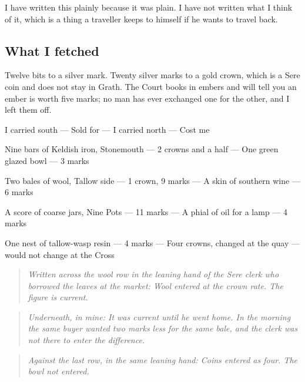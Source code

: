 \documentclass{design/chronicle}
\begin{document}
I have written this plainly because it was plain. I have not written what I think of it, which is a thing a traveller keeps to himself if he wants to travel back.

\subsection*{What I fetched}

Twelve bits to a silver mark. Twenty silver marks to a gold crown, which is a Sere coin and does not stay in Grath. The Court books in embers and will tell you an ember is worth five marks; no man has ever exchanged one for the other, and I left them off.

I carried south — Sold for — I carried north — Cost me\par

Nine bars of Keldish iron, Stonemouth — 2 crowns and a half — One green glazed bowl — 3 marks\par

Two bales of wool, Tallow side — 1 crown, 9 marks — A skin of southern wine — 6 marks\par

A score of coarse jars, Nine Pots — 11 marks — A phial of oil for a lamp — 4 marks\par

One nest of tallow-wasp resin — 4 marks — Four crowns, changed at the quay — would not change at the Cross\par

\begin{quote}\itshape \emph{Written across the wool row in the leaning hand of the Sere clerk who borrowed the leaves at the market:} Wool entered at the crown rate. The figure is current.\end{quote}

\begin{quote}\itshape \end{quote}

\begin{quote}\itshape \emph{Underneath, in mine:} It was current until he went home. In the morning the same buyer wanted two marks less for the same bale, and the clerk was not there to enter the difference.\end{quote}

\begin{quote}\itshape \emph{Against the last row, in the same leaning hand:} Coins entered as four. The bowl not entered.\end{quote}
\end{document}
